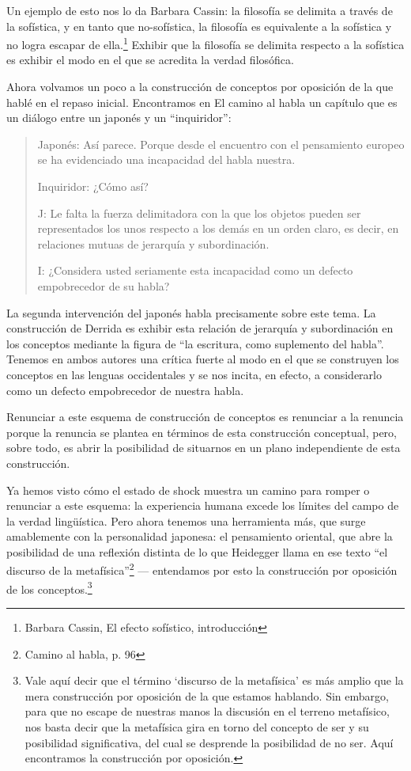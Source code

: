 Un ejemplo de esto nos lo da Barbara Cassin:
la filosofía se delimita a través de la
sofística, y en tanto que no-sofística, la
filosofía es equivalente a la sofística y no
logra escapar de ella.\footnote{Barbara
Cassin, El efecto sofístico, introducción}
Exhibir que la filosofía se delimita respecto
a la sofística es exhibir el modo en el que
se acredita la verdad filosófica.

Ahora volvamos un poco a la construcción de
conceptos por oposición de la que hablé en el
repaso inicial. Encontramos en El camino al
habla un capítulo que es un diálogo entre un
japonés y un ``inquiridor'':

\begin{quote}
Japonés: Así parece. Porque desde el
encuentro con el pensamiento europeo se ha
evidenciado una incapacidad del habla
nuestra.

Inquiridor: ¿Cómo así?

J: Le falta la fuerza delimitadora con la que
los objetos pueden ser representados los unos
respecto a los demás en un orden claro, es
decir, en relaciones mutuas de jerarquía y
subordinación.

I: ¿Considera usted seriamente esta
incapacidad como un defecto empobrecedor de
su habla?
\end{quote}

La segunda intervención del japonés habla
precisamente sobre este tema. La construcción
de Derrida es exhibir esta relación de
jerarquía y subordinación en los conceptos
mediante la figura de ``la escritura, como
suplemento del habla''. Tenemos en ambos
autores una crítica fuerte al modo en el que
se construyen los conceptos en las lenguas
occidentales y se nos incita, en efecto, a
considerarlo como un defecto empobrecedor de
nuestra habla.

Renunciar a este esquema de construcción de
conceptos es renunciar a la renuncia porque
la renuncia se plantea en términos de esta
construcción conceptual, pero, sobre todo, es
abrir la posibilidad de situarnos en un plano
independiente de esta construcción.

Ya hemos visto cómo el estado de shock
muestra un camino para romper o renunciar a
este esquema: la experiencia humana excede
los límites del campo de la verdad
lingüística. Pero ahora tenemos una
herramienta más, que surge amablemente con la
personalidad japonesa: el pensamiento
oriental, que abre la posibilidad de una
reflexión distinta de lo que Heidegger llama
en ese texto ``el discurso de la
metafísica''\footnote{Camino al habla, p. 96}
--- entendamos por esto la construcción por
oposición de los conceptos.\footnote{Vale
aquí decir que el término `discurso de la
metafísica' es más amplio que la mera
construcción por oposición de la que estamos
hablando. Sin embargo, para que no escape de
nuestras manos la discusión en el terreno
metafísico, nos basta decir que la metafísica
gira en torno del concepto de ser y su
posibilidad significativa, del cual se
desprende la posibilidad de no ser. Aquí
encontramos la construcción por oposición.}

